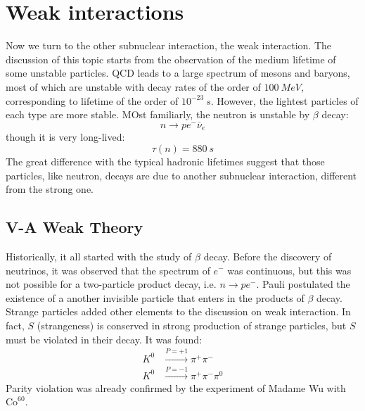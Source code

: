 \documentclass[../../main/main.tex]{subfiles}
\begin{document}
\chapter{Weak interactions}


Now we turn to the other subnuclear interaction, the weak interaction. The discussion of this topic starts from the observation of the medium lifetime of some unstable particles. QCD leads to a large spectrum of mesons and baryons, most of which are unstable with decay rates of the order of \( 100 \ \si{MeV} \), corresponding to lifetime of the order of \( 10^{-23} \ \si{s} \). However, the lightest particles of each type are more stable. MOst familiarly, the neutron is unstable by \( \beta \) decay:
\begin{equation}
	n
	\longrightarrow
	pe^-\bar{\nu}_e
	\label{eq:L12_BD}
\end{equation}
though it is very long-lived:
\begin{equation}
	\tau(n)
	=
	880 \ \si{s}
	\label{eq:L12_BDL}
\end{equation}
The great difference with the typical hadronic lifetimes suggest that those particles, like neutron, decays are due to another subnuclear interaction, different from the strong one.





\section{V-A Weak Theory}
Historically, it all started with the study of \( \beta \) decay. Before the discovery of neutrinos, it was observed that the spectrum of \( e^- \) was continuous, but this was not possible for a two-particle product decay, i.e. \( n \longrightarrow pe^- \). Pauli postulated the existence of a another invisible particle that enters in the products of \( \beta \) decay. Strange particles added other elements to the discussion on weak interaction. In fact, \( S \) (strangeness) is conserved in strong production of strange particles, but \( S \) must be violated in their decay. It was found:
\begin{align}
	K^0 &\xrightarrow{P=+1} \pi^+\pi^-	\\
	K^0 &\xrightarrow{P=-1} \pi^+\pi^-\pi^0
\end{align}
Parity violation was already confirmed by the experiment of Madame Wu with \( \text{Co}^{60} \).
\end{document}
